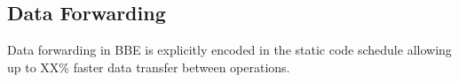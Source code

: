 \subsection{Data Forwarding}
\label{sec:fwd}

Data forwarding in BBE is explicitly encoded in the static code schedule
allowing up to XX\% faster data transfer between operations.
